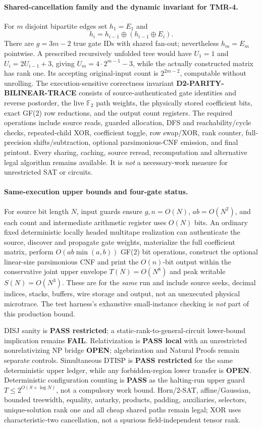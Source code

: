 \documentclass[11pt]{article}
\begin{document}
\paragraph{Shared-cancellation family and the dynamic invariant for TMR-4.}
For $m$ disjoint bipartite edges set $h_1=E_1$ and
\[
h_i=h_{i-1}\oplus(h_{i-1}\oplus E_i).
\]
There are $g=3m-2$ true gate IDs with shared fan-out; nevertheless $h_m=E_m$ pointwise. A prescribed recursively unfolded tree would have $U_1=1$ and $U_i=2U_{i-1}+3$, giving $U_m=4\cdot2^{m-1}-3$, while the actually constructed matrix has rank one. Its accepting original-input count is $2^{2m-2}$, computable without unrolling. The execution-sensitive correctness invariant \textbf{D2-PARITY-BILINEAR-TRACE} consists of source-authenticated gate identities and reverse postorder, the live $\mathbb F_2$ path weights, the physically stored coefficient bits, exact GF(2) row reductions, and the output count registers. The required operations include source reads, guarded allocation, DFS and reachability/cycle checks, repeated-child XOR, coefficient toggle, row swap/XOR, rank counter, full-precision shifts/subtraction, optional parsimonious-CNF emission, and final printout. Every sharing, caching, source reread, recomputation and alternative legal algorithm remains available. It is \emph{not} a necessary-work measure for unrestricted SAT or circuits.

\paragraph{Same-execution upper bounds and four-gate status.}
For source bit length $N$, input guards ensure $g,n=O(N)$, $ab=O(N^2)$, and each count and intermediate arithmetic register uses $O(N)$ bits. An ordinary fixed deterministic locally headed multitape realization can authenticate the source, discover and propagate gate weights, materialize the full coefficient matrix, perform $O(ab\min(a,b))$ GF(2) bit operations, construct the optional linear-size parsimonious CNF and print the $O(n)$-bit output within the conservative joint upper envelope $T(N)=O(N^8)$ and peak writable $S(N)=O(N^3)$. These are for the \emph{same} run and include source seeks, decimal indices, stacks, buffers, wire storage and output, not an unexecuted physical microtrace. The test harness's exhaustive small-instance checking is \emph{not} part of this production bound.

DISJ sanity is \textbf{PASS restricted}; a static-rank-to-general-circuit lower-bound implication remains \textbf{FAIL}. Relativization is \textbf{PASS local} with an unrestricted nonrelativizing NP bridge \textbf{OPEN}; algebrization and Natural Proofs remain separate controls. Simultaneous DTISP is \textbf{PASS restricted} for the same deterministic upper ledger, while any forbidden-region lower transfer is \textbf{OPEN}. Deterministic configuration counting is \textbf{PASS} as the halting-run upper guard $T\le2^{O(S+\log N)}$, not a compulsory work bound. Horn/2-SAT, affine/Gaussian, bounded treewidth, equality, autarky, products, padding, auxiliaries, selectors, unique-solution rank one and all cheap shared paths remain legal; XOR uses characteristic-two cancellation, not a spurious field-independent tensor rank.
\end{document}
